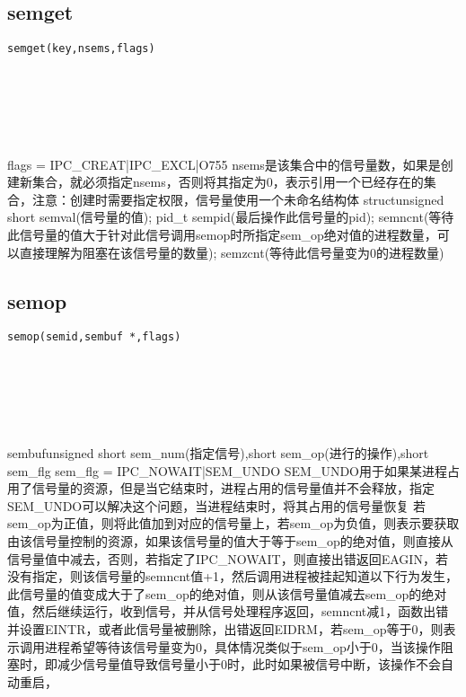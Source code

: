 \documentclass[10pt,a4paper]{article}
\begin{document}
\section{\color[rgb]{0.2,0.4,0.6}{信号量}}
\subsection{semget}
\begin{spacing}{2.0}
\lstset{language=C,numbers=none}
\begin{lstlisting}
semget(key,nsems,flags)
\end{lstlisting}
{\large\color[rgb]{0.2,0.4,0.6}{key:}} \\
{\large\color[rgb]{0.2,0.4,0.6}{nsems:}} \\
{\large\color[rgb]{0.2,0.4,0.6}{flags:}}
\paragraph{ \ \ }flags = IPC\_CREAT|IPC\_EXCL|O755 nsems是该集合中的信号量数，如果是创建新集合，就必须指定nsems，否则将其指定为0，表示引用一个已经存在的集合，注意：创建时需要指定权限，信号量使用一个未命名结构体 struct{unsigned short semval(信号量的值); pid\_t sempid(最后操作此信号量的pid); semncnt(等待此信号量的值大于针对此信号调用semop时所指定sem\_op绝对值的进程数量，可以直接理解为阻塞在该信号量的数量); semzcnt(等待此信号量变为0的进程数量)}
\end{spacing}

\subsection{semop}
\begin{spacing}{2.0}
\lstset{language=C,numbers=none}
\begin{lstlisting}
semop(semid,sembuf *,flags)
\end{lstlisting}
{\large\color[rgb]{0.2,0.4,0.6}{semid:}} \\
{\large\color[rgb]{0.2,0.4,0.6}{*:}} \\
{\large\color[rgb]{0.2,0.4,0.6}{flags:}}
\paragraph{ \ \ }sembuf{unsigned short sem\_num(指定信号),short sem\_op(进行的操作),short sem\_flg} sem\_flg = IPC\_NOWAIT|SEM\_UNDO SEM\_UNDO用于如果某进程占用了信号量的资源，但是当它结束时，进程占用的信号量值并不会释放，指定SEM\_UNDO可以解决这个问题，当进程结束时，将其占用的信号量恢复 若sem\_op为正值，则将此值加到对应的信号量上，若sem\_op为负值，则表示要获取由该信号量控制的资源，如果该信号量的值大于等于sem\_op的绝对值，则直接从信号量值中减去，否则，若指定了IPC\_NOWAIT，则直接出错返回EAGIN，若没有指定，则该信号量的semncnt值+1，然后调用进程被挂起知道以下行为发生，此信号量的值变成大于了sem\_op的绝对值，则从该信号量值减去sem\_op的绝对值，然后继续运行，收到信号，并从信号处理程序返回，semncnt减1，函数出错并设置EINTR，或者此信号量被删除，出错返回EIDRM，若sem\_op等于0，则表示调用进程希望等待该信号量变为0，具体情况类似于sem\_op小于0，当该操作阻塞时，即减少信号量值导致信号量小于0时，此时如果被信号中断，该操作不会自动重启，
\end{spacing}
\end{document}
